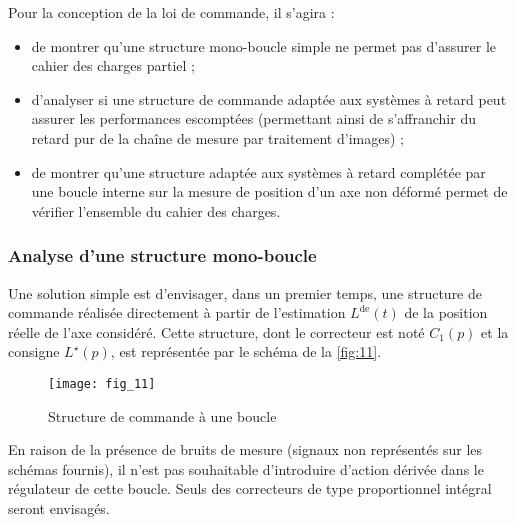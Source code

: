 Pour la conception de la loi de commande, il s’agira :
\begin{itemize}
\item de montrer qu’une structure mono-boucle simple ne permet pas d’assurer le cahier des charges partiel ;
\item d’analyser si une structure de commande adaptée aux systèmes à retard peut assurer les performances
escomptées (permettant ainsi de s’affranchir du retard pur de la chaîne de mesure par traitement d’images) ;
\item de montrer qu’une structure adaptée aux systèmes à retard complétée par une boucle interne sur la mesure
de position d’un axe non déformé permet de vérifier l’ensemble du cahier des charges.
\end{itemize}

\subsubsection{Analyse d’une structure mono-boucle}

Une solution simple est d’envisager, dans un premier temps, une structure de commande réalisée directement à
partir de l’estimation $L^{\text{de}}(t)$ de la position réelle de l’axe considéré. Cette structure, dont le correcteur est noté
$C_1(p)$ et la consigne $L^{\star}(p)$, est représentée par le schéma de la \autoref{fig:11}.


\begin{figure}[H]
\centering
\texttt{[image: fig\_11]}
\caption{\label{fig:11}  Structure de commande à une boucle}
\end{figure}

En raison de la présence de bruits de mesure (signaux non représentés sur les schémas fournis), il n’est pas
souhaitable d’introduire d’action dérivée dans le régulateur de cette boucle. Seuls des correcteurs de type
proportionnel intégral seront envisagés.

\ifprof
\begin{corrige}
\end{corrige}
\else
\fi



